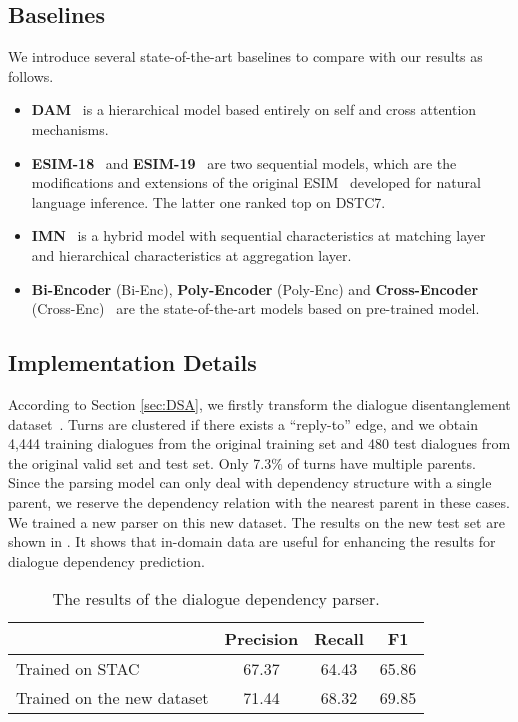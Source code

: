 \subsection{Baselines}
We introduce several state-of-the-art baselines to compare with our results as follows.
\begin{itemize}
	 \item \textbf{DAM}~\cite{WuLCZDYZL18} is a hierarchical model based entirely on self and cross attention mechanisms.
	\item \textbf{ESIM-18}~\cite{abs-1802-02614} and \textbf{ESIM-19}~\cite{abs-1901-02609} are two sequential models, which are the modifications and extensions of the original ESIM~\cite{ChenZLWJI17} developed for natural language inference. The latter one ranked top on DSTC7.
	\item \textbf{IMN}~\cite{GuLL19} is a hybrid model with sequential characteristics at matching layer and hierarchical characteristics at aggregation layer.
	\item \textbf{Bi-Encoder} (Bi-Enc), \textbf{Poly-Encoder} (Poly-Enc) and \textbf{Cross-Encoder} (Cross-Enc)~\cite{humeau2019poly} are the state-of-the-art models based on pre-trained model. 
\end{itemize}



\subsection{Implementation Details }
According to Section \ref{sec:DSA}, we firstly transform the dialogue disentanglement dataset~\cite{KummerfeldGPAGG19}.
Turns are clustered if there exists a ``reply-to'' edge, 
and we obtain 4,444 training dialogues from the original training set and 480 test dialogues 
from the original valid set and test set. Only 7.3\% of turns have multiple parents. 
Since the parsing model can only deal with dependency structure with a single parent, 
we reserve the dependency relation with the nearest parent in these cases. 
We trained a new parser on this new dataset. The results on the new test set are shown 
in . It shows that in-domain data are useful for enhancing the 
results for dialogue dependency prediction.

\begin{table}[th]
	\centering
	\small
	\begin{tabular}{lccc}
		\toprule[1pt]
		\textbf{} & {Precision}& {Recall}& {F1} \\ 
		\midrule[1pt]
		{Trained on STAC} & 67.37 &64.43&65.86\\
		{Trained on the new dataset} & 71.44 & 68.32&69.85\\
		\bottomrule[1pt]
	\end{tabular}
	\caption{The results of the dialogue dependency parser.}
	\label{tab:parser}
\end{table}


